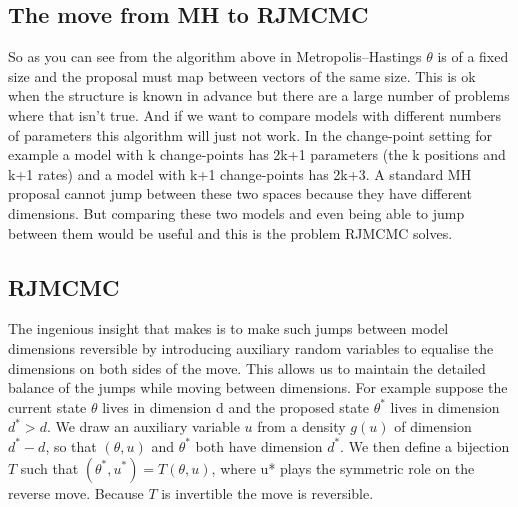 \documentclass[10pt]{article}
\begin{document}
\subsection{The move from MH to RJMCMC}
So as you can see from the algorithm above in Metropolis–Hastings \(\theta\) is of a fixed size and the proposal must map between vectors of the same size. This is ok when the structure is known in advance but there are a large number of problems where that isn't true. And if we want to compare models with different numbers of parameters this algorithm will just not work. In the change-point setting for example a model with k change-points has 2k+1 parameters (the k positions and k+1 rates) and a model with k+1 change-points has 2k+3. A standard MH proposal cannot jump between these two spaces because they have different dimensions. But comparing these two models and even being able to jump between them would be useful and this is the problem RJMCMC solves. 

\subsection{RJMCMC}
\label{sec:rjmcmc}

The ingenious insight that \textcite{green1995reversible} makes is to make such jumps between model dimensions reversible by introducing auxiliary random variables to equalise the dimensions on both sides of the move. This allows us to maintain the detailed balance of the jumps while moving between dimensions. For example suppose the current state \(\theta\) lives in dimension d and the proposed state \(\theta^*\) lives in dimension \(d^* > d\). We draw an auxiliary variable \(u\) from a density \(g(u)\) of dimension \(d^*- d\), so that \((\theta, u)\) and \(\theta^*\) both have dimension \(d^*\). We then define a bijection \(T\) such that $(\theta^*, u^*) = T(\theta, u)$, where u* plays the symmetric role on the reverse move. Because \(T\) is invertible the move is reversible.
\end{document}
